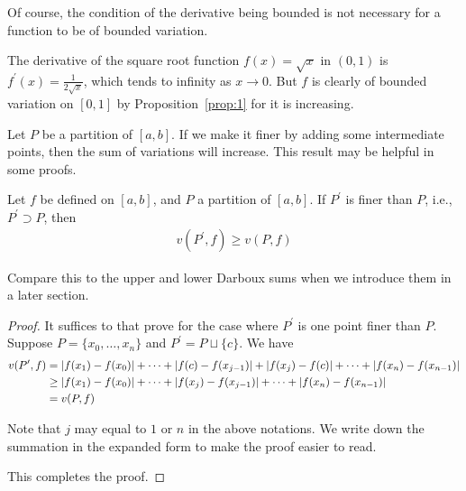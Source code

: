 \documentclass[thmcnt=section, color=blue, 12pt]{my-elegantbook}
\begin{document}
Of course, the condition of the derivative being bounded is not necessary
for a function to be of bounded variation.

\begin{example}
	The derivative of the square root function $f(x) = \sqrt{x}$ in $(0, 1)$
	is $f^\prime(x) = \frac{1}{2\sqrt{x}}$,
	which tends to infinity as $x \to 0$.
	But $f$ is clearly of bounded variation on $[0, 1]$
	by Proposition~\ref{prop:1} for it is increasing.
\end{example}

Let $P$ be a partition of $[a, b]$.
If we make it finer by adding some intermediate points,
then the sum of variations will increase.
This result may be helpful in some proofs.

\begin{proposition} \label{prop:4}
	Let $f$ be defined on $[a, b]$,
	and $P$ a partition of $[a, b]$.
	If $P^\prime$ is finer than $P$, i.e., $P^\prime \supset P$,
	then
	\begin{align*}
		v(P^\prime, f) \geq v(P, f)
	\end{align*}
\end{proposition}

\begin{note}
	Compare this to the upper and lower Darboux sums
	when we introduce them in a later section.
\end{note}

\begin{proof}
	It suffices to that prove for the case
	where $P^\prime$ is one point finer than $P$.
	Suppose $P = \{x_0, \dots, x_n\}$ and $P^\prime = P \sqcup \{c\}$.
	We have
	\begin{align*}
		v(P^\prime, f)
		 & = \left\lvert f(x_1) - f(x_0) \right\rvert + \cdots
		+ \left\lvert f(c) - f(x_{j-1}) \right\rvert + \left\lvert f(x_j) - f(c) \right\rvert + \cdots
		+ \left\lvert f(x_n) - f(x_{n-1}) \right\rvert            \\
		 & \geq \left\lvert f(x_1) - f(x_0) \right\rvert + \cdots
		+ \left\lvert f(x_j) - f(x_{j-1}) \right\rvert + \cdots
		+ \left\lvert f(x_n) - f(x_{n-1}) \right\rvert            \\
		 & = v(P, f)
	\end{align*}
	\begin{note}
		Note that $j$ may equal to $1$ or $n$ in the above notations.
		We write down the summation in the expanded form
		to make the proof easier to read.
	\end{note}
	This completes the proof.
\end{proof}

\end{document}
